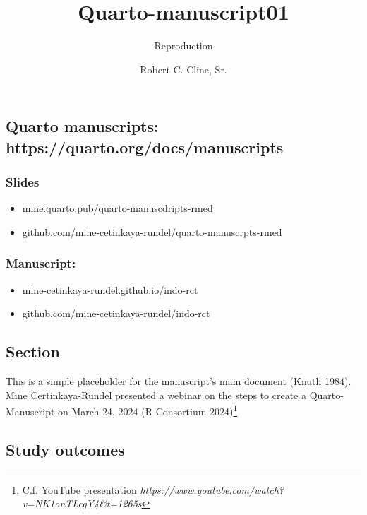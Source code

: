 \documentclass[
  letterpaper,
  DIV=11,
  numbers=noendperiod]{scrartcl}
\title{Quarto-manuscript01}
\subtitle{Reproduction}
\author{Robert C. Cline, Sr.}
\date{}
\providecommand{\tightlist}{%
  \setlength{\itemsep}{0pt}\setlength{\parskip}{0pt}}\usepackage{longtable,booktabs,array}
\begin{document}
\maketitle

\subsection{Quarto manuscripts:
https://quarto.org/docs/manuscripts}\label{quarto-manuscripts-httpsquarto.orgdocsmanuscripts}

\subsubsection{Slides}\label{slides}

\begin{itemize}
\tightlist
\item
  mine.quarto.pub/quarto-manuscdripts-rmed\\
\item
  github.com/mine-cetinkaya-rundel/quarto-manuscrpts-rmed
\end{itemize}

\subsubsection{Manuscript:}\label{manuscript}

\begin{itemize}
\tightlist
\item
  mine-cetinkaya-rundel.github.io/indo-rct\\
\item
  github.com/mine-cetinkaya-rundel/indo-rct
\end{itemize}

\subsection{Section}\label{section}

This is a simple placeholder for the manuscript's main document (Knuth
1984). Mine Certinkaya-Rundel presented a webinar on the steps to create
a Quarto-Manuscript on March 24, 2024 (R Consortium 2024)\footnote{C.f.
  YouTube presentation
  \emph{https://www.youtube.com/watch?v=NK1onTLcgY4\&t=1265s}}

\subsection{Study outcomes}\label{study-outcomes}
\end{document}
